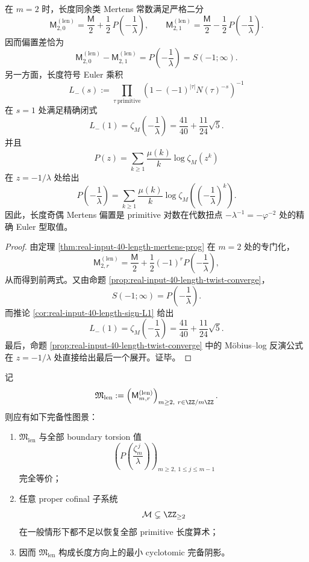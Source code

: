 \begin{theorem}\label{thm:conclusion-length-parity-mertens-algebraic-euler-value}
在 \(m=2\) 时，长度同余类 Mertens 常数满足严格二分
\[
\mathsf M_{2,0}^{(\mathrm{len})}
=
\frac{\mathsf M}{2}
+
\frac12\,P\!\left(-\frac1\lambda\right),
\qquad
\mathsf M_{2,1}^{(\mathrm{len})}
=
\frac{\mathsf M}{2}
-
\frac12\,P\!\left(-\frac1\lambda\right).
\]
因而偏置差恰为
\[
\mathsf M_{2,0}^{(\mathrm{len})}-\mathsf M_{2,1}^{(\mathrm{len})}
=
P\!\left(-\frac1\lambda\right)
=
S(-1;\infty).
\]
另一方面，长度符号 Euler 乘积
\[
L_-(s):=
\prod_{\tau\ \mathrm{primitive}}
\left(1-(-1)^{|\tau|}N(\tau)^{-s}\right)^{-1}
\]
在 \(s=1\) 处满足精确闭式
\[
L_-(1)
=
\zeta_M\!\left(-\frac1\lambda\right)
=
\frac{41}{40}+\frac{11}{24}\sqrt5.
\]
并且
\[
P(z)=\sum_{k\ge 1}\frac{\mu(k)}{k}\log\zeta_M(z^k)
\]
在 \(z=-1/\lambda\) 处给出
\[
P\!\left(-\frac1\lambda\right)
=
\sum_{k\ge 1}\frac{\mu(k)}{k}\log\zeta_M\!\left(\left(-\frac1\lambda\right)^k\right).
\]
因此，长度奇偶 Mertens 偏置是 primitive 对数在代数扭点 \(-\lambda^{-1}=-\varphi^{-2}\) 处的精确 Euler 型取值。
\end{theorem}
\begin{proof}
由定理 \ref{thm:real-input-40-length-mertens-prog} 在 \(m=2\) 处的专门化，
\[
\mathsf M_{2,r}^{(\mathrm{len})}
=
\frac{\mathsf M}{2}
+
\frac12(-1)^rP\!\left(-\frac1\lambda\right),
\]
从而得到前两式。又由命题 \ref{prop:real-input-40-length-twist-converge}，
\[
S(-1;\infty)=P\!\left(-\frac1\lambda\right).
\]
而推论 \ref{cor:real-input-40-length-sign-L1} 给出
\[
L_-(1)=\zeta_M\!\left(-\frac1\lambda\right)=\frac{41}{40}+\frac{11}{24}\sqrt5.
\]
最后，命题 \ref{prop:real-input-40-length-twist-converge} 中的 Möbius--log 反演公式在 \(z=-1/\lambda\) 处直接给出最后一个展开。证毕。
\end{proof}

\begin{conjecture}\label{conj:conclusion-length-congruence-minimal-cyclotomic-shadow}
记
\[
\mathfrak M_{\mathrm{len}}
:=
\left(\mathsf M_{m,r}^{(\mathrm{len})}\right)_{m\ge 2,\ r\in\ZZ/m\ZZ}.
\]
则应有如下完备性图景：
\begin{enumerate}
\item \(\mathfrak M_{\mathrm{len}}\) 与全部 boundary torsion 值
\[
\left(P\!\left(\frac{\zeta_m^{\,j}}{\lambda}\right)\right)_{m\ge 2,\ 1\le j\le m-1}
\]
完全等价；
\item 任意 proper cofinal 子系统
\[
\mathcal M\subsetneq \ZZ_{\ge 2}
\]
在一般情形下都不足以恢复全部 primitive 长度算术；
\item 因而 \(\mathfrak M_{\mathrm{len}}\) 构成长度方向上的最小 cyclotomic 完备阴影。
\end{enumerate}
\end{conjecture}

